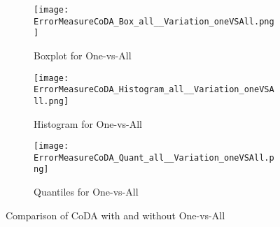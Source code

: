 \begin{figure}[htb!]
\centering
\begin{subfigure}[b]{0.45\textwidth}
\texttt{[image: ErrorMeasureCoDA\_Box\_all\_\_Variation\_oneVSAll.png]}
\caption{Boxplot for One-vs-All}
\label{fig:Coda One-vs-All Box}
\end{subfigure}
\hfill
\begin{subfigure}[b]{0.45\textwidth}
\texttt{[image: ErrorMeasureCoDA\_Histogram\_all\_\_Variation\_oneVSAll.png]}
\caption{Histogram for One-vs-All}
\label{fig:Coda One-vs-All Hist}
\end{subfigure}
\hfill
\begin{subfigure}[b]{0.8\textwidth}
\texttt{[image: ErrorMeasureCoDA\_Quant\_all\_\_Variation\_oneVSAll.png]}
\caption{Quantiles for One-vs-All}
\label{fig:Coda One-vs-All Quant}
\end{subfigure}
\caption{Comparison of CoDA with and without One-vs-All}
\label{fig:Coda One-vs-All Comp1}
\end{figure}

















